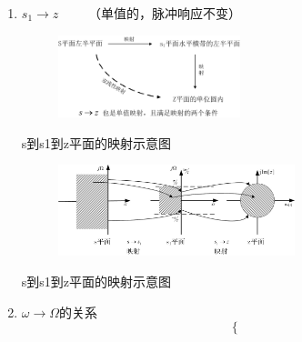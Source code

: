 \documentclass[notheorems,compress,mathserif,table]{beamer}
\begin{document}
\begin{frame}[allowframebreaks]
\begin{enumerate}
$$\begin{aligned}
            \mbox{$\Omega_1$从$(0\rightarrow \frac{\pi}{T})$变化。 \quad}\\
          \end{aligned} \right.
          $$
          注意，这些变换与$\sigma$无关，S平面的横坐标可取任意值。也就说可以看做是水平横带。
          $$\mbox{s平面}\quad  \rightarrow  \quad \mbox{水平横带区域（宽$\frac{2\pi}{T}$）}$$
      \newpage
      \item [2] $s_1 \longrightarrow z\quad\quad$  （单值的，脉冲响应不变）
          \begin{figure}[h]
               \centering
               \includegraphics[width=0.5\textwidth]{fig19_BLT_shiyitu.jpg}
          \end{figure}
          \begin{center}
          s到s1到z平面的映射示意图
          \end{center}
          \begin{figure}[h]
               \centering
               \includegraphics[width=0.650\textwidth]{fig18_BLT_yinsheguanxi.jpg}
          \end{figure}
          \begin{center}
          s到s1到z平面的映射示意图
          \end{center}
      \newpage
      \item  $\omega \longrightarrow \Omega$的关系
          $$
          \left\{\begin{aligned}

\end{aligned}$$
\end{enumerate}
\end{frame}
\end{document}
